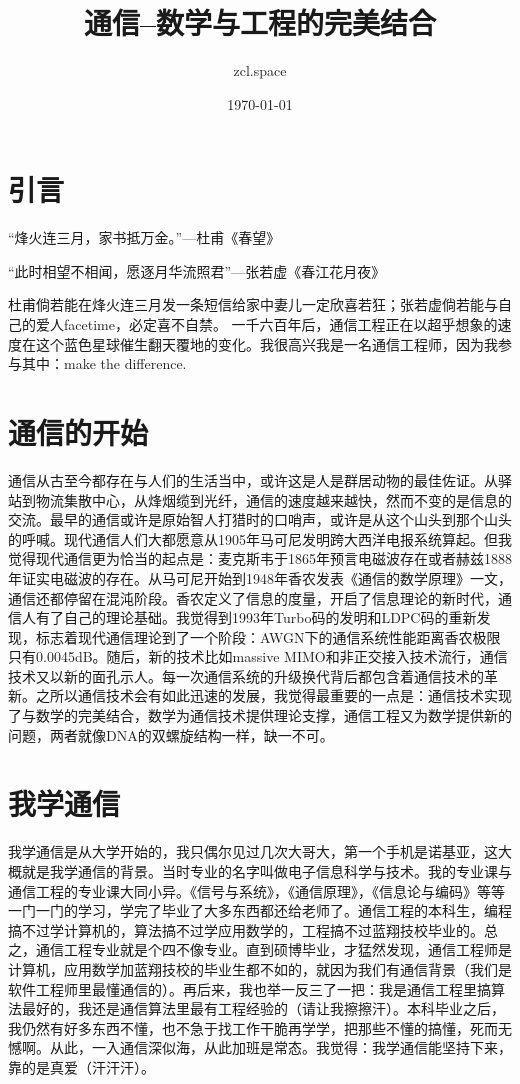 \documentclass[10pt,a4paper,UTF8]{article}
\author{zcl.space}
\date{\today}
\title{通信--数学与工程的完美结合}
\begin{document}
\maketitle\xiaosihao
\tableofcontents\newpage\newpage

\section{引言}
\label{sec:orgheadline1}


“烽火连三月，家书抵万金。”---杜甫《春望》

“此时相望不相闻，愿逐月华流照君”---张若虚《春江花月夜》

杜甫倘若能在烽火连三月发一条短信给家中妻儿一定欣喜若狂；张若虚倘若能与自己的爱人facetime，必定喜不自禁。 一千六百年后，通信工程正在以超乎想象的速度在这个蓝色星球催生翻天覆地的变化。我很高兴我是一名通信工程师，因为我参与其中：make the difference.


\section{通信的开始}
\label{sec:orgheadline2}


通信从古至今都存在与人们的生活当中，或许这是人是群居动物的最佳佐证。从驿站到物流集散中心，从烽烟缆到光纤，通信的速度越来越快，然而不变的是信息的交流。最早的通信或许是原始智人打猎时的口哨声，或许是从这个山头到那个山头的呼喊。现代通信人们大都愿意从1905年马可尼发明跨大西洋电报系统算起。但我觉得现代通信更为恰当的起点是：麦克斯韦于1865年预言电磁波存在或者赫兹1888年证实电磁波的存在。从马可尼开始到1948年香农发表《通信的数学原理》一文，通信还都停留在混沌阶段。香农定义了信息的度量，开启了信息理论的新时代，通信人有了自己的理论基础。我觉得到1993年Turbo码的发明和LDPC码的重新发现，标志着现代通信理论到了一个阶段：AWGN下的通信系统性能距离香农极限只有0.0045dB。随后，新的技术比如massive MIMO和非正交接入技术流行，通信技术又以新的面孔示人。每一次通信系统的升级换代背后都包含着通信技术的革新。之所以通信技术会有如此迅速的发展，我觉得最重要的一点是：通信技术实现了与数学的完美结合，数学为通信技术提供理论支撑，通信工程又为数学提供新的问题，两者就像DNA的双螺旋结构一样，缺一不可。

\section{我学通信}
\label{sec:orgheadline3}


我学通信是从大学开始的，我只偶尔见过几次大哥大，第一个手机是诺基亚，这大概就是我学通信的背景。当时专业的名字叫做电子信息科学与技术。我的专业课与通信工程的专业课大同小异。《信号与系统》，《通信原理》，《信息论与编码》等等一门一门的学习，学完了毕业了大多东西都还给老师了。通信工程的本科生，编程搞不过学计算机的，算法搞不过学应用数学的，工程搞不过蓝翔技校毕业的。总之，通信工程专业就是个四不像专业。直到硕博毕业，才猛然发现，通信工程师是计算机，应用数学加蓝翔技校的毕业生都不如的，就因为我们有通信背景（我们是软件工程师里最懂通信的）。再后来，我也举一反三了一把：我是通信工程里搞算法最好的，我还是通信算法里最有工程经验的（请让我擦擦汗）。本科毕业之后，我仍然有好多东西不懂，也不急于找工作干脆再学学，把那些不懂的搞懂，死而无憾啊。从此，一入通信深似海，从此加班是常态。我觉得：我学通信能坚持下来，靠的是真爱（汗汗汗）。
\end{document}
